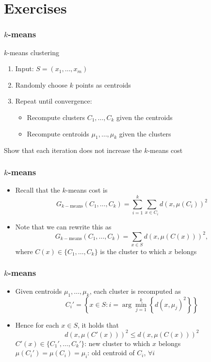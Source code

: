 \documentclass[10pt]{beamer}
\begin{document}
\section{Exercises}

\begin{frame}
  \frametitle{$k$-means}
  \begin{block}{$k$-means clustering}
  \begin{enumerate}
    \item Input: $S=(x_1,\ldots,x_m)$
	\item Randomly choose $k$ points as centroids
	\item Repeat until convergence:
  \begin{itemize}
    \item Recompute clusters $C_1,\ldots,C_k$ given the centroids
	\item Recompute centroids $\mu_1,\ldots,\mu_k$ given the clusters
  \end{itemize}
  \end{enumerate}
  \end{block}
  Show that each iteration does not increase the $k$-means cost
\end{frame}

\begin{frame}
  \frametitle{$k$-means}
  \begin{itemize}
	\item Recall that the $k$-means cost is
	\[G_{k-\text{means}}(C_1,\ldots,C_k) = \sum_{i=1}^k\sum_{x\in C_i} d(x,\mu(C_i))^2\]
	\pause
	\item Note that we can rewrite this as
	\[G_{k-\text{means}}(C_1,\ldots,C_k) = \sum_{x\in S} d(x,\mu(C(x)))^2,\]
	where $C(x)\in\{C_1,\ldots,C_k\}$ is the cluster to which $x$ belongs
  \end{itemize}
\end{frame}

\begin{frame}
  \frametitle{$k$-means}
  \begin{itemize}
	\item Given centroids $\mu_1,\ldots,\mu_k$, each cluster is recomputed as
	\[C_i' =  \left\{x\in S: i = \arg\min_{j=1}^k \left\{ d(x,\mu_j)^2 \right\} \right\}\]
	\pause
	\item Hence for each $x\in S$, it holds that
	\[d(x,\mu(C'(x)))^2 \leq d(x,\mu(C(x)))^2\]
	$C'(x)\in\{C_1',\ldots,C_k'\}$: {\color{red} new} cluster to which $x$ belongs\\
	$\mu(C_i')=\mu(C_i)=\mu_i$: {\color{red} old} centroid of $C_i$, $\forall i$
  \end{itemize}
\end{frame}
\end{document}
